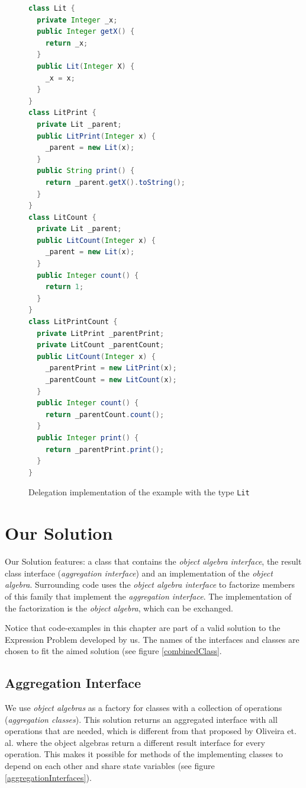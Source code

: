 \documentclass{report}
\begin{document}
\begin{figure}[H]
\begin{lstlisting}[language=java]
class Lit {
  private Integer _x;
  public Integer getX() {
    return _x;
  }
  public Lit(Integer X) {
    _x = x;
  }
}
class LitPrint {
  private Lit _parent;
  public LitPrint(Integer x) {
    _parent = new Lit(x);
  }
  public String print() {
    return _parent.getX().toString();
  }
}
class LitCount {
  private Lit _parent;
  public LitCount(Integer x) {
    _parent = new Lit(x);
  }
  public Integer count() {
    return 1;
  }
}
class LitPrintCount {
  private LitPrint _parentPrint;
  private LitCount _parentCount;
  public LitCount(Integer x) {
    _parentPrint = new LitPrint(x);
    _parentCount = new LitCount(x);
  }
  public Integer count() {
    return _parentCount.count();
  }
  public Integer print() {
    return _parentPrint.print();
  }
}
\end{lstlisting}
\caption{Delegation implementation of the example with the type \lstinline{Lit}}
\label{delegationExample}
\end{figure}


\section{Our Solution}

\label{suggestedEPSolution}

Our Solution features: a class that contains the \emph{object algebra interface}, the result class interface (\emph{aggregation interface}) and an implementation of the \emph{object algebra}. Surrounding code uses the \emph{object algebra interface} to factorize members of this family that implement the \emph{aggregation interface}. The implementation of the factorization is the \emph{object algebra}, which can be exchanged.

Notice that code-examples in this chapter are part of a valid solution to the Expression Problem developed by us. The names of the interfaces and classes are chosen to fit the aimed solution (see figure \ref{combinedClass}.

\subsection{Aggregation Interface}

We use \emph{object algebras} as a factory for classes with a collection of operations (\emph{aggregation classes}). This solution returns an aggregated interface with all operations that are needed, which is different from that proposed by Oliveira et. al. where the object algebras return a different result interface for every operation. This makes it possible for methods of the implementing classes to depend on each other and share state variables (see figure \ref{aggregationInterfaces}).
\end{document}
